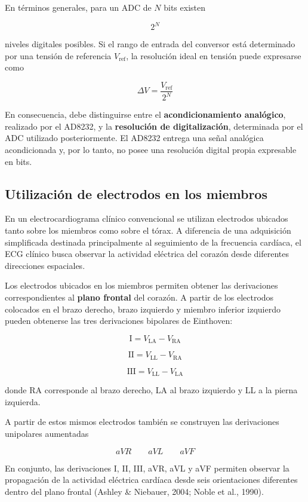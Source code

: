 \documentclass[12pt,a4paper]{article}
\begin{document}
En términos generales, para un ADC de $N$ bits existen

\[
2^N
\]

niveles digitales posibles. Si el rango de entrada del conversor está
determinado por una tensión de referencia $V_{\mathrm{ref}}$, la resolución
ideal en tensión puede expresarse como

\[
\Delta V = \frac{V_{\mathrm{ref}}}{2^N}
\]

En consecuencia, debe distinguirse entre el \textbf{acondicionamiento
analógico}, realizado por el AD8232, y la \textbf{resolución de
digitalización}, determinada por el ADC utilizado posteriormente. El AD8232
entrega una señal analógica acondicionada y, por lo tanto, no posee una
resolución digital propia expresable en bits.


\subsection{Utilización de electrodos en los miembros}

En un electrocardiograma clínico convencional se utilizan electrodos ubicados
tanto sobre los miembros como sobre el tórax. A diferencia de una adquisición
simplificada destinada principalmente al seguimiento de la frecuencia
cardíaca, el ECG clínico busca observar la actividad eléctrica del corazón
desde diferentes direcciones espaciales.

Los electrodos ubicados en los miembros permiten obtener las derivaciones
correspondientes al \textbf{plano frontal} del corazón. A partir de los
electrodos colocados en el brazo derecho, brazo izquierdo y miembro inferior
izquierdo pueden obtenerse las tres derivaciones bipolares de Einthoven:

\[
\mathrm{I} = V_{\mathrm{LA}} - V_{\mathrm{RA}}
\]

\[
\mathrm{II} = V_{\mathrm{LL}} - V_{\mathrm{RA}}
\]

\[
\mathrm{III} = V_{\mathrm{LL}} - V_{\mathrm{LA}}
\]

donde RA corresponde al brazo derecho, LA al brazo izquierdo y LL a la pierna izquierda.

A partir de estos mismos electrodos también se construyen las derivaciones
unipolares aumentadas

\[
aVR \qquad aVL \qquad aVF
\]

En conjunto, las derivaciones I, II, III, aVR, aVL y aVF permiten observar la
propagación de la actividad eléctrica cardíaca desde seis orientaciones
diferentes dentro del plano frontal (Ashley \& Niebauer, 2004; Noble et al.,
1990).
\end{document}
